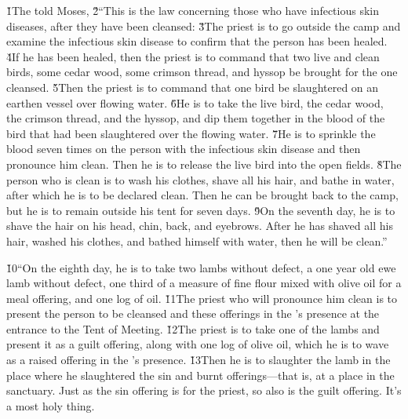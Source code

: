 \v{1}The  told Moses, \v{2}``This is the law concerning those who have infectious skin diseases, after they have been cleansed: \v{3}The priest is to go outside the camp and examine the infectious skin disease to confirm that the person has been healed. \v{4}If he has been healed, then the priest is to command that two live and clean birds, some cedar wood, some crimson thread, and hyssop be brought for the one cleansed. \v{5}Then the priest is to command that one bird be slaughtered on an earthen vessel over flowing water. \v{6}He is to take the live bird, the cedar wood, the crimson thread, and the hyssop, and dip them together in the blood of the bird that had been slaughtered over the flowing water. \v{7}He is to sprinkle the blood seven times on the person with the infectious skin disease and then pronounce him clean. Then he is to release the live bird into the open fields. \v{8}The person who is clean is to wash his clothes, shave all his hair, and bathe in water, after which he is to be declared clean. Then he can be brought back to the camp, but he is to remain outside his tent for seven days. \v{9}On the seventh day, he is to shave the hair on his head, chin, back, and eyebrows. After he has shaved all his hair, washed his clothes, and bathed himself with water, then he will be clean.''

\v{10}``On the eighth day, he is to take two lambs without defect, a one year old ewe lamb without defect, one third of a measure of fine flour mixed with olive oil for a meal offering, and one log of oil. \v{11}The priest who will pronounce him clean is to present the person to be cleansed and these offerings in the 's presence at the entrance to the Tent of Meeting. \v{12}The priest is to take one of the lambs and present it as a guilt offering, along with one log of olive oil, which he is to wave as a raised offering in the 's presence. \v{13}Then he is to slaughter the lamb in the place where he slaughtered the sin and burnt offerings---that is, at a place in the sanctuary. Just as the sin offering is for the priest, so also is the guilt offering. It's a most holy thing.

